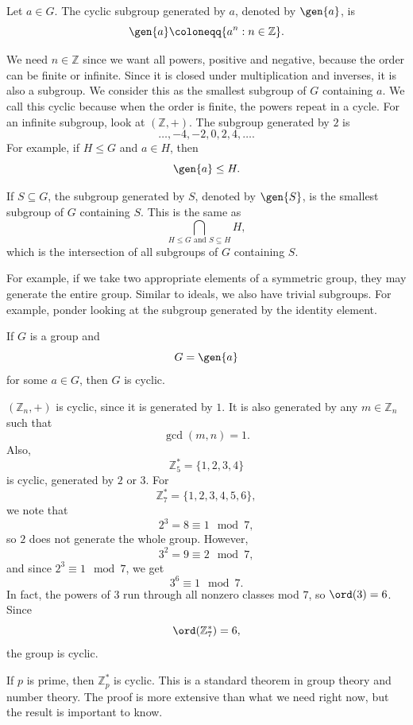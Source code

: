 \begin{definition}
    Let $a\in G$.
    The cyclic subgroup generated by $a$, denoted by $\gen{a}$, is
    \[
        \gen{a}\coloneqq \{a^n:n\in\mathbb{Z}\}.
    \]
\end{definition}

We need $n\in\mathbb{Z}$ since we want all powers, positive and negative, because the order can be finite or infinite.
Since it is closed under multiplication and inverses, it is also a subgroup.
We consider this as the smallest subgroup of $G$ containing $a$.
We call this cyclic because when the order is finite, the powers repeat in a cycle.
For an infinite subgroup, look at $(\mathbb{Z},+)$.
The subgroup generated by $2$ is
\[
    \dots,-4,-2,0,2,4,\dots.
\]
For example, if $H\leq G$ and $a\in H$, then
\[
    \gen{a}\leq H.
\]
\begin{definition}
    If $S\subseteq G$, the subgroup generated by $S$, denoted by $\gen{S}$, is the smallest subgroup of $G$ containing $S$.
    This is the same as
    \[
        \bigcap\limits_{H\leq G \text{ and } S\subseteq H} H,
    \]
    which is the intersection of all subgroups of $G$ containing $S$.
\end{definition}

For example, if we take two appropriate elements of a symmetric group, they may generate the entire group.
Similar to ideals, we also have trivial subgroups.
For example, ponder looking at the subgroup generated by the identity element.

\begin{definition}
    If $G$ is a group and
    \[
        G=\gen{a}
    \]
    for some $a\in G$, then $G$ is cyclic.
\end{definition}

$(\mathbb{Z}_n,+)$ is cyclic, since it is generated by $1$.
It is also generated by any $m\in\mathbb{Z}_n$ such that
\[
    \gcd(m,n)=1.
\]
Also,
\[
    \mathbb{Z}_5^*=\{1,2,3,4\}
\]
is cyclic, generated by $2$ or $3$.
For
\[
    \mathbb{Z}_7^*=\{1,2,3,4,5,6\},
\]
we note that
\[
    2^3=8\equiv 1\mod 7,
\]
so $2$ does not generate the whole group.
However,
\[
    3^2=9\equiv 2\mod 7,
\]
and since $2^3\equiv 1\mod 7$, we get
\[
    3^6\equiv 1\mod 7.
\]
In fact, the powers of $3$ run through all nonzero classes mod $7$, so $\ord(3)=6$.
Since
\[
    \ord(\mathbb{Z}_7^*)=6,
\]
the group is cyclic.

\begin{theorem}{
    If $p$ is prime, then $\mathbb{Z}_p^*$ is cyclic.
}
    This is a standard theorem in group theory and number theory.
    The proof is more extensive than what we need right now, but the result is important to know.
\end{theorem}
